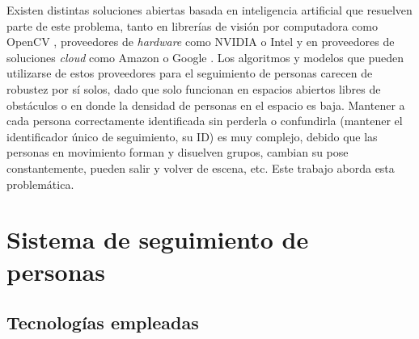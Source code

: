 \documentclass[a4paper]{IEEEtran}
\begin{document}
Existen distintas soluciones abiertas basada en inteligencia artificial que resuelven parte de este problema, tanto en librerías de visión por computadora como OpenCV \cite{b1}, proveedores de \textit{hardware} como NVIDIA \cite{b2} o Intel \cite{b3} y en proveedores de soluciones \textit{cloud} como Amazon \cite{b4}  o Google \cite{b5}. Los algoritmos y modelos que pueden utilizarse de estos proveedores para el seguimiento de personas carecen de robustez por sí solos, dado que solo funcionan en espacios abiertos libres de obstáculos o en donde la densidad de personas en el espacio es baja. Mantener a cada persona correctamente identificada sin perderla o confundirla (mantener el identificador único de seguimiento, su ID) es muy complejo, debido que las personas en movimiento forman y disuelven grupos, cambian su pose constantemente, pueden salir y volver de escena, etc. Este trabajo aborda esta problemática.

\section{Sistema de seguimiento de personas}

\subsection{Tecnologías empleadas}
\end{document}
